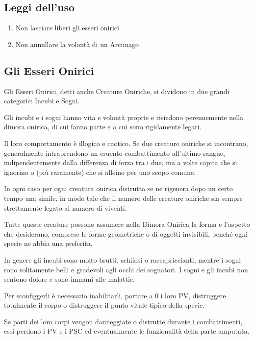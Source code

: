 \subsection{Leggi dell'uso}
\begin{enumerate}\itemsep -6pt
\item Non lasciare liberi gli esseri onirici
\item Non annullare la volont\`a di un Arcimago 
\end{enumerate}


\subsection{Gli Esseri Onirici}

Gli Esseri Onirici, detti anche Creature Oniriche, si dividono in due
grandi categorie: Incubi e Sogni. 

Gli incubi e i sogni hanno vita e volont\`a proprie e risiedono
perennemente nella dimora onirica, di cui fanno parte e a cui sono
rigidamente legati.

Il loro comportamento \`e illogico e caotico.  Se due creature
oniriche si incontrano, generalmente intraprendono un cruento
combattimento all'ultimo sangue, indipendentemente dalla differenza di
forza tra i due, ma a volte capita che si ignorino o (pi\`u
raramente) che si alleino per uno scopo comune.

In ogni caso per ogni creatura onirica distrutta se ne
rigenera dopo un certo tempo una simile, in modo tale che il numero delle creature
oniriche sia sempre strettamente legato al numero di viventi. 

Tutte queste creature possono assumere nella Dimora Onirica la forma e
l'aspetto che desiderano, comprese le forme geometriche o di oggetti
invisibili, bench\'e ogni specie ne abbia una preferita.

In genere gli incubi sono molto brutti, schifosi o raccapriccianti,
mentre i sogni sono solitamente belli e gradevoli agli occhi dei
sognatori.  I sogni e gli incubi non sentono dolore e sono immuni alle
malattie.

Per sconfiggerli \`e necessario inabilitarli, portare a 0 i loro PV,
distruggere totalmente il corpo o distruggere il punto vitale tipico
della specie. 

Se parti dei loro corpi vengon danneggiate o distrutte durante i
combattimenti, essi perdono i PV e i PSC ed eventualmente le
funzionalit\`a della parte amputata.


